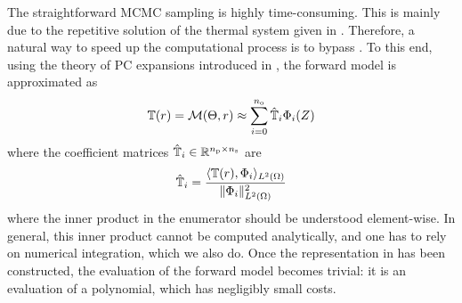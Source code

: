 The straightforward MCMC sampling is highly time-consuming. This is mainly due to the repetitive solution of the thermal system given in . Therefore, a natural way to speed up the computational process is to bypass . To this end, using the theory of PC expansions introduced in , the forward model is approximated as
\begin{equation} \elabel{pc-approximation}
  \mT(\r) = \model{\Param, \r} \approx \sum_{i = 0}^\norder \hat{\mT}_i \vpcb_i(\vZ)
\end{equation}
where the coefficient matrices $\hat{\mathbb{T}}_i \in \mathbb{R}^{{n_\text{p}} \times {n_\text{s}}}$ are
\[
  \hat{\mathbb{T}}_i = \frac{\langle \mathbb{T}(r), \Phi_i \rangle_{L^{2}(\Omega)}}{\| \Phi_i \|^2_{L^{2}(\Omega)}}
\]
where the inner product in the enumerator should be understood element-wise. In general, this inner product cannot be computed analytically, and one has to rely on numerical integration, which we also do. Once the representation in  has been constructed, the evaluation of the forward model becomes trivial: it is an evaluation of a polynomial, which has negligibly small costs.
